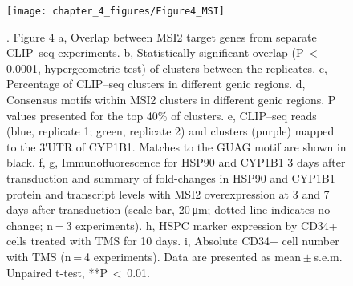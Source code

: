 \begin{figure}[ht]
  \centering
  \texttt{[image: chapter\_4\_figures/Figure4\_MSI]}
  \caption[Figure 3]{. Figure 4
    a, Overlap between MSI2 target genes from separate CLIP–seq experiments. b, Statistically significant overlap (P $<$ 0.0001, hypergeometric test) of clusters between the replicates. c, Percentage of CLIP–seq clusters in different genic regions. d, Consensus motifs within MSI2 clusters in different genic regions. P values presented for the top 40\% of clusters. e, CLIP–seq reads (blue, replicate 1; green, replicate 2) and clusters (purple) mapped to the 3′UTR of CYP1B1. Matches to the GUAG motif are shown in black. f, g, Immunofluorescence for HSP90 and CYP1B1 3 days after transduction and summary of fold-changes in HSP90 and CYP1B1 protein and transcript levels with MSI2 overexpression at 3 and 7 days after transduction (scale bar, 20 μm; dotted line indicates no change; n = 3 experiments). h, HSPC marker expression by CD34+ cells treated with TMS for 10 days. i, Absolute CD34+ cell number with TMS (n = 4 experiments). Data are presented as mean $\pm$ s.e.m. Unpaired t-test, **P $<$ 0.01.}
  \label{fig:Figure_3}
\end{figure}

